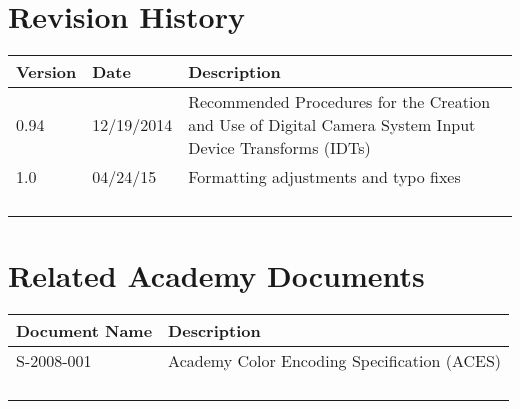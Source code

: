 \prelimsectionformat	%
\chapter{Revision History}

\begin{tabularx}{\linewidth}{|l|l|X|}
    \hline
    Version     & 
    Date        & 
    Description
    \\ \hline
    0.94        & 
    12/19/2014  & 
    Recommended Procedures for the Creation and Use of Digital Camera System Input Device Transforms (IDTs)
    \\ \hline
    1.0         &
    04/24/15    &
    Formatting adjustments and typo fixes
    \\ \hline
                &
                &
                
    \\ \hline
                &
                &
                
    \\ \hline
                &
                &
                
    \\ \hline
                &
                &
                
    \\ \hline
\end{tabularx}

\vspace{0.25in} %

\chapter{Related Academy Documents} %
\begin{tabularx}{\linewidth}{|l|X|}
    \hline
    Document Name & Description  
    \\ \hline
    S-2008-001 & Academy Color Encoding Specification (ACES) \\ \hline
    & \\ \hline
    & \\ \hline
    & \\ \hline
    & \\ \hline
\end{tabularx}